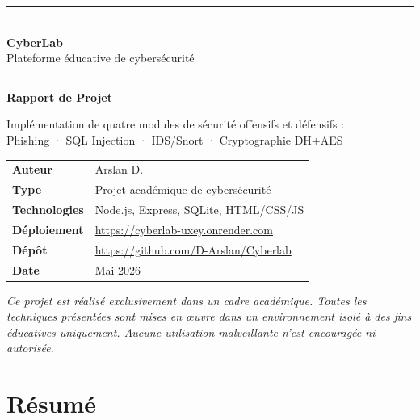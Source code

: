 \documentclass[12pt,a4paper]{report}
\begin{document}
\begin{titlepage}
  \centering
  \vspace*{2cm}

  \rule{\textwidth}{1.5pt}\\[6pt]
  {\LARGE\bfseries CyberLab}\\[4pt]
  {\large Plateforme éducative de cybersécurité}\\[4pt]
  \rule{\textwidth}{0.8pt}

  \vspace{2cm}

  {\Huge\bfseries Rapport de Projet}

  \vspace{1.5cm}

  {\large
    Implémentation de quatre modules de sécurité offensifs et défensifs :\\[8pt]
    Phishing · SQL Injection · IDS/Snort · Cryptographie DH+AES
  }

  \vspace{2.5cm}

  \begin{tabular}{ll}
    \textbf{Auteur}         & Arslan D. \\[5pt]
    \textbf{Type}           & Projet académique de cybersécurité \\[5pt]
    \textbf{Technologies}   & Node.js, Express, SQLite, HTML/CSS/JS \\[5pt]
    \textbf{Déploiement}    & \url{https://cyberlab-uxey.onrender.com} \\[5pt]
    \textbf{Dépôt}          & \url{https://github.com/D-Arslan/Cyberlab} \\[5pt]
    \textbf{Date}           & Mai 2026 \\
  \end{tabular}

  \vfill

  \begin{notebox}
    \small\itshape
    Ce projet est réalisé exclusivement dans un cadre académique.
    Toutes les techniques présentées sont mises en œuvre dans un
    environnement isolé à des fins éducatives uniquement. Aucune
    utilisation malveillante n'est encouragée ni autorisée.
  \end{notebox}

\end{titlepage}

\chapter*{Résumé}
\end{document}
